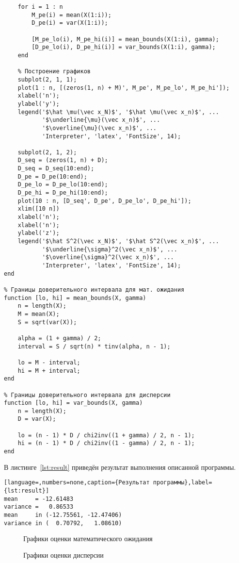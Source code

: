\begin{lstlisting}[caption={Текст программы},label={lst:programm}]
    % Заполнение созданных массивов
    for i = 1 : n
        M_pe(i) = mean(X(1:i));
        D_pe(i) = var(X(1:i));

        [M_pe_lo(i), M_pe_hi(i)] = mean_bounds(X(1:i), gamma);
        [D_pe_lo(i), D_pe_hi(i)] = var_bounds(X(1:i), gamma);
    end

    % Построение графиков
    subplot(2, 1, 1);
    plot(1 : n, [(zeros(1, n) + M)', M_pe', M_pe_lo', M_pe_hi']);
    xlabel('n');
    ylabel('y');
    legend('$\hat \mu(\vec x_N)$', '$\hat \mu(\vec x_n)$', ...
           '$\underline{\mu}(\vec x_n)$', ...
           '$\overline{\mu}(\vec x_n)$', ...
           'Interpreter', 'latex', 'FontSize', 14);

    subplot(2, 1, 2);
    D_seq = (zeros(1, n) + D);
    D_seq = D_seq(10:end);
    D_pe = D_pe(10:end);
    D_pe_lo = D_pe_lo(10:end);
    D_pe_hi = D_pe_hi(10:end);
    plot(10 : n, [D_seq', D_pe', D_pe_lo', D_pe_hi']);
    xlim([10 n])
    xlabel('n');
    xlabel('n');
    ylabel('z');
    legend('$\hat S^2(\vec x_N)$', '$\hat S^2(\vec x_n)$', ...
           '$\underline{\sigma}^2(\vec x_n)$', ...
           '$\overline{\sigma}^2(\vec x_n)$', ...
           'Interpreter', 'latex', 'FontSize', 14);
end

% Границы доверительного интервала для мат. ожидания
function [lo, hi] = mean_bounds(X, gamma)
    n = length(X);
    M = mean(X);
    S = sqrt(var(X));

    alpha = (1 + gamma) / 2;
    interval = S / sqrt(n) * tinv(alpha, n - 1);

    lo = M - interval;
    hi = M + interval;
end

% Границы доверительного интервала для дисперсии
function [lo, hi] = var_bounds(X, gamma)
    n = length(X);
    D = var(X);

    lo = (n - 1) * D / chi2inv((1 + gamma) / 2, n - 1);
    hi = (n - 1) * D / chi2inv((1 - gamma) / 2, n - 1);
end
\end{lstlisting}

В листинге~\ref{lst:result} приведён результат выполнения описанной программы.
\begin{lstlisting}[language=,numbers=none,caption={Результат программы},label={lst:result}]
mean     = -12.61483
variance =   0.86533
mean     in (-12.75561, -12.47406)
variance in (  0.70792,   1.08610)
\end{lstlisting}

\begin{figure}[H]
    \caption{Графики оценки математического ожидания}\label{img:plot01}

    
\end{figure}

\begin{figure}[H]
    \caption{Графики оценки дисперсии}\label{img:plot02}
    
\end{figure}

